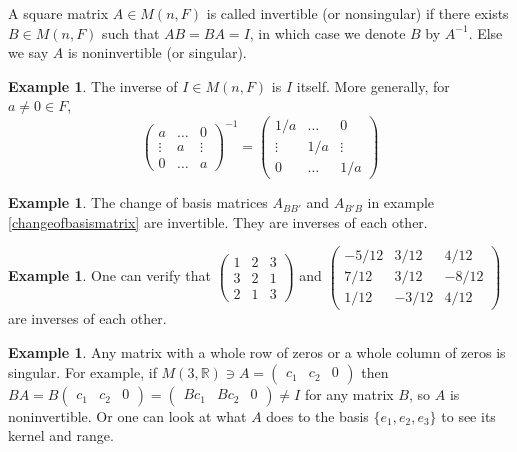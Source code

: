 \documentclass[12pt]{amsart}
\theoremstyle{definition}
\newtheorem{example}[theorem]{Example}
\begin{document}
\dfn A square matrix $A \in M(n, F)$ is called invertible (or nonsingular) if there exists $B \in M(n, F)$ such that $AB = BA =I$, in which case we denote $B$ by $A^{-1}$. Else we say $A$ is noninvertible (or singular).

\begin{example} The inverse of $I \in M(n, F)$ is $I$ itself. More generally, for $a \neq 0 \in F$,
$$\left(\begin{array}{ccc} a & \dots & 0 \\ \vdots & a & \vdots \\ 0 & \dots & a \end{array}\right)^{-1} = \left(\begin{array}{ccc} 1/a & \dots & 0 \\ \vdots & 1/a & \vdots \\ 0 & \dots & 1/a \end{array}\right)$$
\end{example}

\begin{example}\label{} The change of basis matrices $A_{BB'}$ and $A_{B'B}$ in example \ref{changeofbasismatrix} are invertible. They are inverses of each other.
\end{example}

\begin{example}\label{inverseexample} One can verify that $\left(\begin{array}{ccc} 1 & 2 & 3 \\ 3 & 2 & 1 \\ 2 & 1 & 3 \end{array}\right)$ and $\left(\begin{array}{ccc} -5/12 & 3/12 & 4/12\\ 7/12 & 3/12 & -8/12 \\ 1/12 & -3/12 & 4/12 \end{array}\right)$ are inverses of each other.
\end{example}

\begin{example} Any matrix with a whole row of zeros or a whole column of zeros is singular. For example, if $M(3, \mathbb{R}) \owns A = \left(\begin{array}{ccc} c_1 & c_2 & 0 \end{array}\right)$ then $BA = B\left(\begin{array}{ccc} c_1 & c_2 & 0 \end{array}\right) = \left(\begin{array}{ccc} Bc_1 & Bc_2 & 0 \end{array}\right) \neq I$ for any matrix $B$, so $A$ is noninvertible. Or one can look at what $A$ does to the basis $\{e_1, e_2, e_3\}$ to see its kernel and range.
\end{example}
\end{document}
